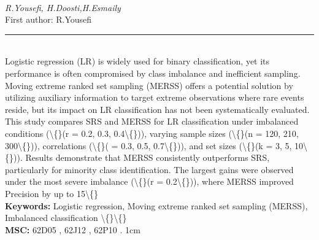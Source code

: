 \documentclass[10pt,twoside]{article}
\begin{document}
\noindent\begin{minipage}[t][\textheight]{\textwidth}
\\[0.35em]
{\itshape R.Yousefi, H.Doosti,H.Esmaily}\\[0.2em]
{\footnotesize First author: R.Yousefi}\\[0.45em]
\noindent\rule{\textwidth}{0.3pt}\\[0.4em]
{\footnotesize  Logistic regression (LR) is widely used for binary classification, yet its performance is often compromised by class imbalance and inefficient sampling. Moving extreme ranked set sampling (MERSS) offers a potential solution by utilizing auxiliary information to target extreme observations where rare events reside, but its impact on LR classification has not been systematically evaluated. This study compares SRS and MERSS for LR classification under imbalanced conditions (\textbackslash\{\}(r = 0.2, 0.3, 0.4\textbackslash\{\})), varying sample sizes (\textbackslash\{\}(n = 120, 210, 300\textbackslash\{\})), correlations (\textbackslash\{\}( = 0.3, 0.5, 0.7\textbackslash\{\})), and set sizes (\textbackslash\{\}(k = 3, 5, 10\textbackslash\{\})). Results demonstrate that MERSS consistently outperforms SRS, particularly for minority class identification. The largest gains were observed under the most severe imbalance (\textbackslash\{\}(r = 0.2\textbackslash\{\})), where MERSS improved Precision by up to 15\textbackslash\{\}}\\[0.4em]
{\footnotesize\bfseries Keywords:} {\footnotesize Logistic regression, Moving extreme ranked set sampling (MERSS), Imbalanced classification \textbackslash\{\}\textbackslash\{\}}\\[0.15em]
{\footnotesize\bfseries MSC:} {\footnotesize 62D05 , 62J12 , 62P10 . 1cm}\\
\vfill
\end{minipage}
\newpage
\end{document}
